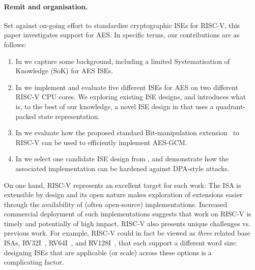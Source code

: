
\paragraph{Remit and organisation.}

Set against on-going effort to standardise cryptographic ISEs for RISC-V,
this paper investigates support for AES.
In specific terms, our contributions are as follows:

\begin{enumerate}

\item In 
      we capture some background, including a limited
      Systematisation of Knowledge (SoK)
      for AES ISEs.

\item In 
      we implement and evaluate five different ISEs for AES on two different 
      RISC-V CPU cores.
      We exploring existing ISE designs, 
      and introduces what is, to the best of our knowledge, a novel ISE design
      in  
      that uses a quadrant-packed state representation.

\item In
      we evaluate how the
      proposed standard 
      Bit-manipulation
      extension~\cite[Section 21]{RV:ISA:I:19}
      to RISC-V can be used to efficiently implement AES-GCM.

\item In
      we select one candidate ISE design from 
      ,
      and demonstrate how the associated implementation can be hardened
      against DPA-style attacks.

\end{enumerate}

\noindent
On one hand, 
RISC-V represents an excellent target for such work:
The ISA is extensible by design and its open nature makes
exploration of extensions easier through the availability of
(often open-source) implementations.  
Increased commercial deployment of such implementations suggests that work 
on RISC-V is timely and potentially of high impact.
RISC-V also presents unique challenges vs. previous work.
For example,
RISC-V could in fact be viewed as {\em three} related base ISAs,
 RV32I~\cite[Section 2]{RV:ISA:I:19},
 RV64I~\cite[Section 5]{RV:ISA:I:19},
and
RV128I~\cite[Section 6]{RV:ISA:I:19},
that each support a different word size:
designing ISEs that are applicable (or scale) across these options is a
complicating factor.

%

